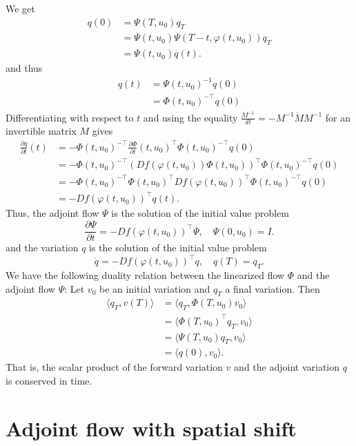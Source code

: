 \documentclass[11pt,a4paper]{article}
\begin{document}
We get 
\begin{align*}
    q(0) &= \Psi(T,u_0)q_T \\
         &= \Psi(t,u_0)\Psi(T-t,\varphi(t,u_0))q_T \\
         &= \Psi(t,u_0)q(t).
\end{align*}
and thus
\begin{align*}
     q(t) &= \Psi(t,u_0)^{-1}q(0) \\
          &= \Phi(t,u_0)^{-\top}q(0)
\end{align*}
Differentiating with respect to $t$ and using the equality $\frac{\dot{M^{-1}}}{dt} = -M^{-1}\dot{M}M^{-1}$ for an invertible matrix $M$ gives
\begin{align*}
    \frac{\partial q}{\partial t}(t) &= -\Phi(t,u_0)^{-\top}\frac{\partial \Phi}{\partial t}(t,u_0)^{\top}\Phi(t,u_0)^{-\top}q(0) \\
    &= -\Phi(t,u_0)^{-\top}\left(Df(\varphi(t,u_0))\Phi(t,u_0)\right)^{\top}\Phi(t,u_0)^{-\top}q(0) \\
    &= -\Phi(t,u_0)^{-\top}\Phi(t,u_0)^{\top}Df(\varphi(t,u_0))^{\top}\Phi(t,u_0)^{-\top}q(0) \\
    &= -Df(\varphi(t,u_0))^{\top}q(t).
\end{align*}
Thus, the adjoint flow $\Psi$ is the solution of the initial value problem
\begin{equation}\label{eq:adjoint_flow}
    \frac{\partial \Psi}{\partial t} = -Df(\varphi(t,u_0))^\top\Psi, \quad \Psi(0,u_0) = I.
\end{equation} and the variation $q$ is the solution of the initial value problem
\begin{equation}\label{eq:variation}
    \dot{q} = -Df(\varphi(t,u_0))^\top q, \quad q(T) = q_T.
\end{equation}
We have the following duality relation between the linearized flow $\Phi$ and the adjoint flow $\Psi$: Let $v_0$ be an initial variation and $q_T$ a final variation. Then
\begin{align*}
    \langle q_T, v(T) \rangle &= \langle q_T, \Phi(T,u_0)v_0 \rangle \\
    &= \langle \Phi(T,u_0)^\top q_T, v_0 \rangle \\
    &= \langle \Psi(T,u_0) q_T, v_0 \rangle \\
    &= \langle q(0), v_0 \rangle.
\end{align*}
That is, the scalar product of the forward variation $v$ and the adjoint variation $q$ is conserved in time.

\section{Adjoint flow with spatial shift}
\end{document}
